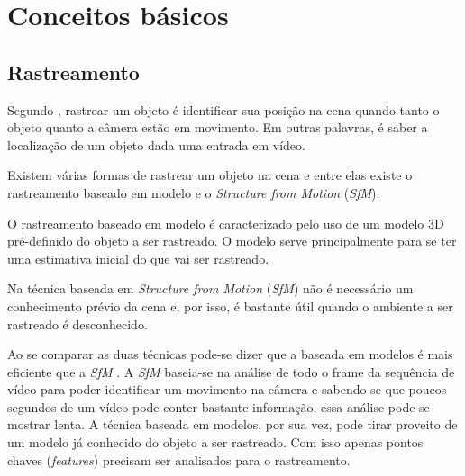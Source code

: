 \chapter{Conceitos básicos}

\section{Rastreamento}

Segundo \cite{lepetit}, rastrear um objeto é identificar sua posição na cena quando tanto o objeto quanto a câmera estão em movimento. Em outras palavras, é saber a localização de um objeto dada uma entrada em vídeo.

Existem várias formas de rastrear um objeto na cena \cite{teichrieb2007survey} e entre elas existe o rastreamento baseado em modelo e o \emph{Structure from Motion} (\emph{SfM}).

O rastreamento baseado em modelo é caracterizado pelo uso de um modelo 3D pré-definido do objeto a ser rastreado. O modelo serve principalmente para se ter uma estimativa inicial do que vai ser rastreado.

Na técnica baseada em \emph{Structure from Motion} (\emph{SfM}) \cite{teichrieb2007survey} não é necessário um conhecimento prévio da cena e, por isso, é bastante útil quando o ambiente a ser rastreado é desconhecido.

Ao se comparar as duas técnicas pode-se dizer que a baseada em modelos é mais eficiente que a \emph{SfM} \cite{drummondecipolla}. A \emph{SfM} baseia-se na análise de todo o frame da sequência de vídeo para poder identificar um movimento na câmera e sabendo-se que poucos segundos de um vídeo pode conter bastante informação, essa análise pode se mostrar lenta. A técnica baseada em modelos, por sua vez, pode tirar proveito de um modelo já conhecido do objeto a ser rastreado. Com isso apenas pontos chaves (\emph{features}) precisam ser analisados para o rastreamento.


